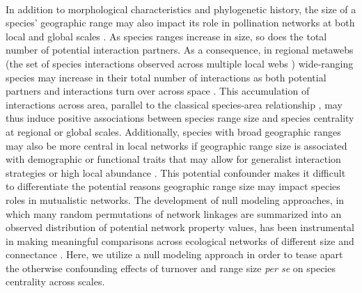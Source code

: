 \documentclass[12pt]{article}
\begin{document}
\paragraph*{}
In addition to morphological characteristics and phylogenetic history, the size of a species' geographic range may also impact its role in pollination networks at both local and global scales \citep{moulatlet2023species, dattilo2020species}. 
As species ranges increase in size, so does the total number of potential interaction partners. As a consequence, in regional metawebs (the set of species interactions observed across multiple local webs \citep{poisot2012dissimilarity}) wide-ranging species may increase in their total number of interactions as both potential partners and interactions turn over across space \citep{fricke2020accelerating, martins2022global}. 
This accumulation of interactions across area, parallel to the classical species-area relationship \citep{burkle2012shifts,sugiura2012scale, galiana2018spatial, dallas2021species}, may thus induce positive associations between species range size and species centrality at regional or global scales.
Additionally, species with broad geographic ranges may also be more central in local networks if geographic range size is associated with demographic or functional traits that may allow for generalist interaction strategies or high local abundance \citep{holt1997relationship, hurtado2024generalism, Moulatlet2025General}. This potential confounder makes it difficult to differentiate the potential reasons geographic range size may impact species roles in mutualistic networks. The development of null modeling approaches, in which many random permutations of network linkages are summarized into an observed distribution of potential network property values, has been instrumental in making meaningful comparisons across ecological networks of different size and connectance \citep{dormann2017identifying, guimaraes2020structure, bluthgen2024critical}. Here, we utilize a null modeling approach in order to tease apart the otherwise confounding effects of turnover and range size \textit{per se} on species centrality across scales. 
\end{document}
